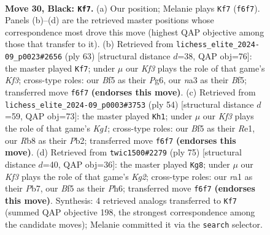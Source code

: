 \documentclass[11pt]{article}
\begin{document}
\clearpage

\begin{figure}[p]\centering
\begin{subfigure}{0.46\textwidth}\centering
\resizebox{\linewidth}{!}{%
\newchessgame
\chessboard[
  setfen={1rr5/7p/1p3k2/p4bQ1/7P/N7/PP3PP1/R5K1 b - - 8 30},
  showmover=false,
  pgfstyle=straightmove, color=movearrow, markmove={f6-f7}
]}
\caption{}
\end{subfigure}\hfill
\begin{subfigure}{0.46\textwidth}\centering
\resizebox{\linewidth}{!}{%
\newchessgame
\chessboard[
  setfen={4r3/pp6/4rkp1/5bQ1/4p2P/2P5/PPP5/1K1R4 b - - 2 32},
  showmover=false,
  pgfstyle=straightmove, color=movearrow, markmove={f6-f7}
]}
\caption{}
\end{subfigure}
\\[4pt]
\begin{subfigure}{0.46\textwidth}\centering
\resizebox{\linewidth}{!}{%
\newchessgame
\chessboard[
  setfen={5rk1/2p3pp/p7/3P2p1/2P5/B6P/1P3q2/2R1R1K1 w - - 0 28},
  showmover=false,
  pgfstyle=straightmove, color=movearrow, markmove={g1-h1}
]}
\caption{}
\end{subfigure}\hfill
\begin{subfigure}{0.46\textwidth}\centering
\resizebox{\linewidth}{!}{%
\newchessgame
\chessboard[
  setfen={8/1p4k1/2rr3p/p1b2Q1N/P7/6P1/1P3PKP/8 b - - 12 38},
  showmover=false,
  pgfstyle=straightmove, color=movearrow, markmove={g7-g8}
]}
\caption{}
\end{subfigure}
\caption{\textbf{Move 30, Black: \texttt{Kf7}.} (a) Our position; Melanie plays \texttt{Kf7} (\texttt{f6f7}). Panels (b)--(d) are the retrieved master positions whose correspondence most drove this move (highest QAP objective among those that transfer to it). (b) Retrieved from \texttt{lichess\_elite\_2024-09\_p0023\#2656} (ply 63) [structural distance $d$=38, QAP obj=76]: the master played \texttt{Kf7}; under $\mu$ our \emph{Kf3} plays the role of that game's \emph{Kf3}; cross-type roles: our \emph{B}f5 as their \emph{P}g6, our \emph{n}a3 as their \emph{B}f5; transferred move \texttt{f6f7} \textbf{(endorses this move)}. (c) Retrieved from \texttt{lichess\_elite\_2024-09\_p0003\#3753} (ply 54) [structural distance $d$=59, QAP obj=73]: the master played \texttt{Kh1}; under $\mu$ our \emph{Kf3} plays the role of that game's \emph{Kg1}; cross-type roles: our \emph{B}f5 as their \emph{R}e1, our \emph{R}b8 as their \emph{P}b2; transferred move \texttt{f6f7} \textbf{(endorses this move)}. (d) Retrieved from \texttt{twic1500\#2279} (ply 75) [structural distance $d$=40, QAP obj=36]: the master played \texttt{Kg8}; under $\mu$ our \emph{Kf3} plays the role of that game's \emph{Kg2}; cross-type roles: our \emph{r}a1 as their \emph{P}b7, our \emph{B}f5 as their \emph{P}h6; transferred move \texttt{f6f7} \textbf{(endorses this move)}. Synthesis: 4 retrieved analogs transferred to \texttt{Kf7} (summed QAP objective 198, the strongest correspondence among the candidate moves); Melanie committed it via the \texttt{search} selector.}
\label{fig:thought-m59}
\end{figure}
\end{document}
